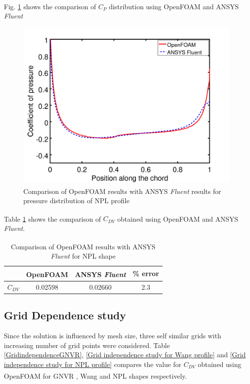 Fig. \ref{NPL fig} shows the comparison of $ C_{P} $ distribution using OpenFOAM\textsuperscript{\textregistered} and ANSYS\textsuperscript{\textregistered} \textit{Fluent}
\begin{figure}[H]
	\centering
	\includegraphics[width=300 pt]{rnd/NPL_cp.png}
	\caption{Comparison of OpenFOAM\textsuperscript{\textregistered} results with ANSYS\textsuperscript{\textregistered} \textit{Fluent} results for pressure distribution of NPL profile \cite{cheeseman2012}}
	\label{NPL fig} %
\end{figure} 


Table \ref{NPL table} shows the comparison of $ C_{DV} $ obtained using OpenFOAM\textsuperscript{\textregistered} and ANSYS\textsuperscript{\textregistered} \textit{Fluent}.

\begin{table} [H]
	\centering
	\caption{\label{NPL table} Comparison of OpenFOAM\textsuperscript{\textregistered} results with ANSYS\textsuperscript{\textregistered} \textit{Fluent} for NPL shape}
	\begin{tabular}{cccc}
		\hline \hline
		& OpenFOAM\textsuperscript{\textregistered} & ANSYS\textsuperscript{\textregistered} \textit{Fluent} & \% error \\ \hline \hline
		
		$ C_{DV} $ & 0.02598 & 0.02660 & 2.3    \\   \hline
	\end{tabular}
\end{table}

\pagebreak

\subsection{Grid Dependence study}
Since the solution is influenced by mesh size, three self similar grids with increasing number of grid points were considered. Table \ref{GridindependenceGNVR}, \ref{Grid independence study for Wang profile} and \ref{Grid independence study for NPL profile} compares the value for $C_{DV}$ obtained using OpenFOAM\textsuperscript{\textregistered} for GNVR \cite{Ram}, Wang \cite{Wangshape} and NPL\cite{cheeseman2012} shapes respectively.


